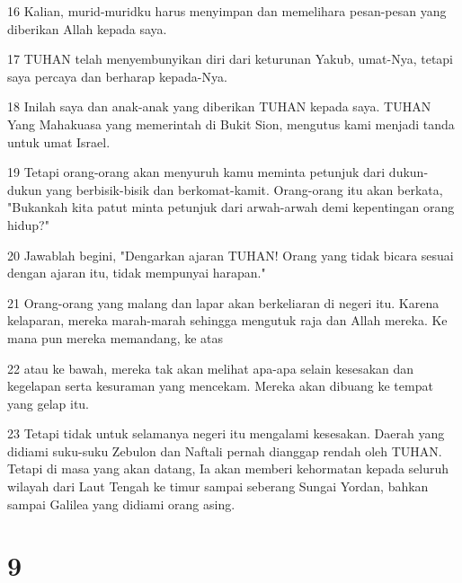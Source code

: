 \par 16 Kalian, murid-muridku harus menyimpan dan memelihara pesan-pesan yang diberikan Allah kepada saya.
\par 17 TUHAN telah menyembunyikan diri dari keturunan Yakub, umat-Nya, tetapi saya percaya dan berharap kepada-Nya.
\par 18 Inilah saya dan anak-anak yang diberikan TUHAN kepada saya. TUHAN Yang Mahakuasa yang memerintah di Bukit Sion, mengutus kami menjadi tanda untuk umat Israel.
\par 19 Tetapi orang-orang akan menyuruh kamu meminta petunjuk dari dukun-dukun yang berbisik-bisik dan berkomat-kamit. Orang-orang itu akan berkata, "Bukankah kita patut minta petunjuk dari arwah-arwah demi kepentingan orang hidup?"
\par 20 Jawablah begini, "Dengarkan ajaran TUHAN! Orang yang tidak bicara sesuai dengan ajaran itu, tidak mempunyai harapan."
\par 21 Orang-orang yang malang dan lapar akan berkeliaran di negeri itu. Karena kelaparan, mereka marah-marah sehingga mengutuk raja dan Allah mereka. Ke mana pun mereka memandang, ke atas
\par 22 atau ke bawah, mereka tak akan melihat apa-apa selain kesesakan dan kegelapan serta kesuraman yang mencekam. Mereka akan dibuang ke tempat yang gelap itu.
\par 23 Tetapi tidak untuk selamanya negeri itu mengalami kesesakan. Daerah yang didiami suku-suku Zebulon dan Naftali pernah dianggap rendah oleh TUHAN. Tetapi di masa yang akan datang, Ia akan memberi kehormatan kepada seluruh wilayah dari Laut Tengah ke timur sampai seberang Sungai Yordan, bahkan sampai Galilea yang didiami orang asing.

\chapter{9}


